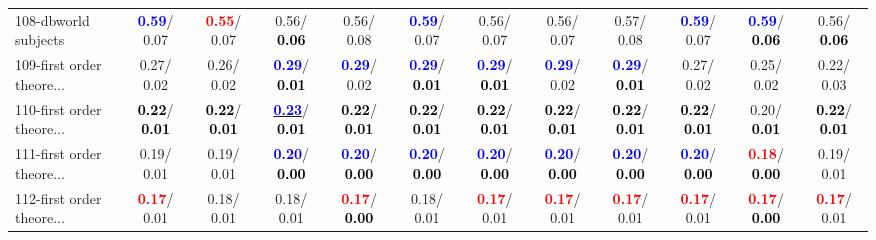 \begin{table}[h]
\begin{center}
{\begin{tabular}{lc|c|c|c|c|c|c|c|c|c|c}
108-dbworld subjects & \textcolor{blue}{\textbf{  0.59}}/  0.07 & \textcolor{red}{\textbf{  0.55}}/  0.07 &   0.56/\textcolor{black}{\textbf{  0.06}} &   0.56/  0.08 & \textcolor{blue}{\textbf{  0.59}}/  0.07 &   0.56/  0.07 &   0.56/  0.07 &   0.57/  0.08 & \textcolor{blue}{\textbf{  0.59}}/  0.07 & \textcolor{blue}{\textbf{  0.59}}/\textcolor{black}{\textbf{  0.06}} &   0.56/\textcolor{black}{\textbf{  0.06}} \\
109-first order theore... &   0.27/  0.02 &   0.26/  0.02 & \textcolor{blue}{\textbf{  0.29}}/\textcolor{black}{\textbf{  0.01}} & \textcolor{blue}{\textbf{  0.29}}/  0.02 & \textcolor{blue}{\textbf{  0.29}}/\textcolor{black}{\textbf{  0.01}} & \textcolor{blue}{\textbf{  0.29}}/\textcolor{black}{\textbf{  0.01}} & \textcolor{blue}{\textbf{  0.29}}/  0.02 & \textcolor{blue}{\textbf{  0.29}}/\textcolor{black}{\textbf{  0.01}} &   0.27/  0.02 &   0.25/  0.02 &   0.22/  0.03 \\
110-first order theore... & \textcolor{black}{\textbf{  0.22}}/\textcolor{black}{\textbf{  0.01}} & \textcolor{black}{\textbf{  0.22}}/\textcolor{black}{\textbf{  0.01}} & \underline{\textcolor{blue}{\textbf{  0.23}}}/\textcolor{black}{\textbf{  0.01}} & \textcolor{black}{\textbf{  0.22}}/\textcolor{black}{\textbf{  0.01}} & \textcolor{black}{\textbf{  0.22}}/\textcolor{black}{\textbf{  0.01}} & \textcolor{black}{\textbf{  0.22}}/\textcolor{black}{\textbf{  0.01}} & \textcolor{black}{\textbf{  0.22}}/\textcolor{black}{\textbf{  0.01}} & \textcolor{black}{\textbf{  0.22}}/\textcolor{black}{\textbf{  0.01}} & \textcolor{black}{\textbf{  0.22}}/\textcolor{black}{\textbf{  0.01}} &   0.20/\textcolor{black}{\textbf{  0.01}} & \textcolor{black}{\textbf{  0.22}}/\textcolor{black}{\textbf{  0.01}} \\ \hline
111-first order theore... &   0.19/  0.01 &   0.19/  0.01 & \textcolor{blue}{\textbf{  0.20}}/\textcolor{black}{\textbf{  0.00}} & \textcolor{blue}{\textbf{  0.20}}/\textcolor{black}{\textbf{  0.00}} & \textcolor{blue}{\textbf{  0.20}}/\textcolor{black}{\textbf{  0.00}} & \textcolor{blue}{\textbf{  0.20}}/\textcolor{black}{\textbf{  0.00}} & \textcolor{blue}{\textbf{  0.20}}/\textcolor{black}{\textbf{  0.00}} & \textcolor{blue}{\textbf{  0.20}}/\textcolor{black}{\textbf{  0.00}} & \textcolor{blue}{\textbf{  0.20}}/\textcolor{black}{\textbf{  0.00}} & \textcolor{red}{\textbf{  0.18}}/\textcolor{black}{\textbf{  0.00}} &   0.19/  0.01 \\
112-first order theore... & \textcolor{red}{\textbf{  0.17}}/  0.01 &   0.18/  0.01 &   0.18/  0.01 & \textcolor{red}{\textbf{  0.17}}/\textcolor{black}{\textbf{  0.00}} &   0.18/  0.01 & \textcolor{red}{\textbf{  0.17}}/  0.01 & \textcolor{red}{\textbf{  0.17}}/  0.01 & \textcolor{red}{\textbf{  0.17}}/  0.01 & \textcolor{red}{\textbf{  0.17}}/  0.01 & \textcolor{red}{\textbf{  0.17}}/\textcolor{black}{\textbf{  0.00}} & \textcolor{red}{\textbf{  0.17}}/  0.01 \\

\end{tabular}}
\end{center}
\end{table}
